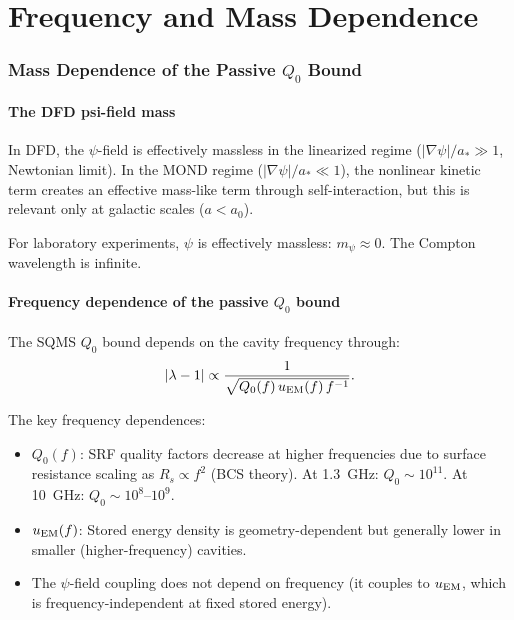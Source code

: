 \documentclass[11pt]{article}
\newcommand{\lbone}{|\lambda - 1|}
\theoremstyle{definition}
\theoremstyle{remark}
\begin{document}
\part{Frequency and Mass Dependence}
\label{part:frequency}


\section{Mass Dependence of the Passive $Q_0$ Bound}
\label{sec:mass_dependence}

\subsection{The DFD psi-field mass}

In DFD, the $\psi$-field is effectively massless in the linearized
regime ($|\nabla\psi|/a_* \gg 1$, Newtonian limit). In the MOND regime
($|\nabla\psi|/a_* \ll 1$), the nonlinear kinetic term creates an
effective mass-like term through self-interaction, but this is relevant
only at galactic scales ($a < a_0$).

For laboratory experiments, $\psi$ is effectively massless:
$m_\psi \approx 0$. The Compton wavelength is infinite.

\subsection{Frequency dependence of the passive $Q_0$ bound}

The SQMS $Q_0$ bound depends on the cavity frequency through:
\begin{equation}
\lbone \propto \frac{1}{\sqrt{Q_0(f)\,u_{\rm EM}(f)\,f^{-1}}}.
\label{eq:freq_scaling}
\end{equation}

The key frequency dependences:
\begin{itemize}[nosep]
\item $Q_0(f)$: SRF quality factors decrease at higher frequencies
  due to surface resistance scaling as $R_s \propto f^2$ (BCS theory).
  At 1.3~GHz: $Q_0 \sim 10^{11}$. At 10~GHz: $Q_0 \sim 10^8$--$10^9$.
\item $u_{\rm EM}(f)$: Stored energy density is geometry-dependent
  but generally lower in smaller (higher-frequency) cavities.
\item The $\psi$-field coupling does not depend on frequency
  (it couples to $u_{\rm EM}$, which is frequency-independent
  at fixed stored energy).
\end{itemize}
\end{document}

